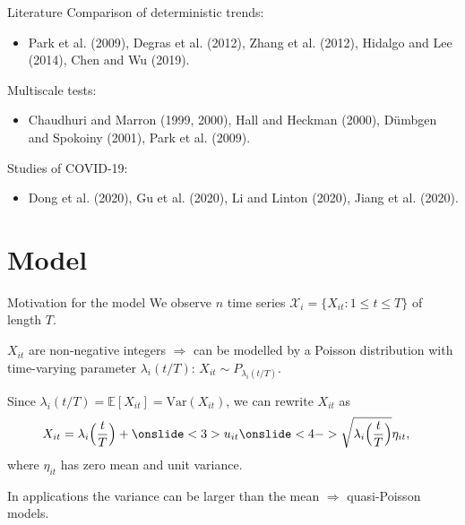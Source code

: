 \documentclass[10pt, handout]{beamer}
\newcommand{\E}{\mathbb{E}}
\newcommand{\Var}{\mathrm{Var}}
\begin{document}
\begin{frame}{Literature}
	Comparison of deterministic trends:
	\begin{itemize}
		\item {Park et al. (2009)}, Degras et al. (2012), Zhang et al. (2012), Hidalgo and Lee (2014), Chen and Wu (2019).
	\end{itemize}\pause\pause
	Multiscale tests:
	\begin{itemize}
		\item Chaudhuri and Marron (1999, 2000), Hall and Heckman (2000), D{\"u}mbgen and Spokoiny (2001), {Park et al. (2009)}.
	\end{itemize}\pause\pause
	Studies of COVID-19:
	\begin{itemize}
		\item {Dong et al. (2020)}, Gu et al. (2020), Li and Linton (2020), Jiang et al. (2020).
	\end{itemize}
\end{frame}


\section{Model}
\begin{frame}{Motivation for the model}
We observe $n$ time series $\mathcal{X}_i = \{X_{it}: 1 \le t \le T \}$ of length $T$.\pause

\vspace{3mm}

$X_{it}$ are non-negative integers $\Rightarrow$ can be modelled by a Poisson distribution with time-varying parameter $\lambda_i(t/T)$: $X_{it} \sim P_{\lambda_i(t/T)}$.\pause
\vspace{3mm}

Since $\lambda_i(t/T) = \E[X_{it}] = \Var(X_{it})$, we can rewrite $X_{it}$ as
\vspace{-2mm}
\begin{align*}
X_{it} &= \lambda_i\Big(\frac{t}{T}\Big) + \onslide<3>{u_{it} }\onslide<4->{\sqrt{\lambda_i\Big(\frac{t}{T}\Big)} \eta_{it},}
\end{align*}
where $\eta_{it}$ has zero mean and unit variance.

\vspace{3mm}

In applications the variance can be larger than the mean $\Rightarrow$ quasi-Poisson models.
\end{frame}
\end{document}
